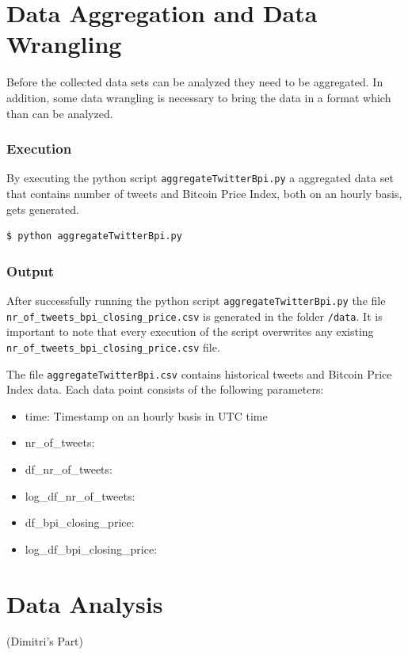 \documentclass[a4paper,12pt]{article}
\begin{document}
\begin{spacing}{1.2}
\section{Data Aggregation and Data Wrangling}
Before the collected data sets can be analyzed they need to be aggregated. In addition, some data wrangling is necessary to bring the data in a format which than can be analyzed. 

\subsubsection{Execution}
By executing the python script \verb|aggregateTwitterBpi.py| a aggregated data set that contains number of tweets and Bitcoin Price Index, both on an hourly basis, gets generated. 
\begin{lstlisting}[language=bash]
    $ python aggregateTwitterBpi.py
\end{lstlisting}

\subsubsection{Output}
After successfully running the python script \verb|aggregateTwitterBpi.py| the file \verb|nr_of_tweets_bpi_closing_price.csv| is generated in the folder \verb|/data|. It is important to note that every execution of the script overwrites any existing \verb|nr_of_tweets_bpi_closing_price.csv| file.

The file \verb|aggregateTwitterBpi.csv| contains historical tweets and Bitcoin Price Index data. Each data point consists of the following parameters:
\begin{itemize}
    \item time: Timestamp on an hourly basis in UTC time
    \item {nr\_of\_tweets}: 
    \item {df\_nr\_of\_tweets}: 
    \item {log\_df\_nr\_of\_tweets}: 
    \item {df\_bpi\_closing\_price}: 
    \item {log\_df\_bpi\_closing\_price}: 
\end{itemize}


\section{Data Analysis}
(Dimitri's Part)

\end{spacing}
\clearpage

\printbibliography
\clearpage

\end{document}
